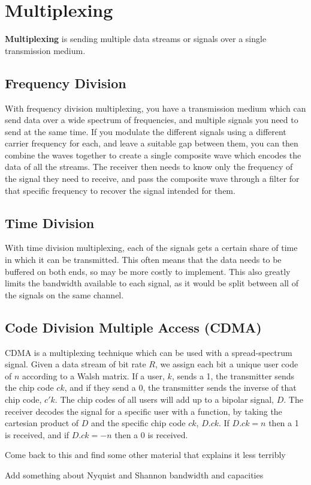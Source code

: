 \section*{Multiplexing}

\begin{definition*}{}{}
  \textbf{Multiplexing} is sending multiple data streams or signals over a single transmission medium.
\end{definition*}

\subsection*{Frequency Division}

With frequency division multiplexing, you have a transmission medium which can send data over a wide spectrum of frequencies,
 and multiple signals you need to send at the same time. If you modulate the different signals using a different carrier
 frequency for each, and leave a suitable gap between them, you can then combine the waves together to create a single
 composite wave which encodes the data of all the streams. The receiver then needs to know only the frequency of the
 signal they need to receive, and pass the composite wave through a filter for that specific frequency to recover the
 signal intended for them.

\subsection*{Time Division}

With time division multiplexing, each of the signals gets a certain share of time in which it can be transmitted. This
 often means that the data needs to be buffered on both ends, so may be more costly to implement. This also greatly
 limits the bandwidth available to each signal, as it would be split between all of the signals on the same channel.

\subsection*{Code Division Multiple Access (CDMA)}

CDMA is a multiplexing technique which can be used with a spread-spectrum signal. Given a data stream of bit rate $R$,
 we assign each bit a unique user code of $n$ according to a Walsh matrix. If a user, $k$, sends a 1, the transmitter
 sends the chip code $ck$, and if they send a 0, the transmitter sends the inverse of that chip code, $c'k$. The chip
 codes of all users will add up to a bipolar signal, $D$. The receiver decodes the signal for a specific user with a
 function, by taking the cartesian product of $D$ and the specific chip code $ck$, $D.ck$. If $D.ck = n$ then a 1 is
 received, and if $D.ck = -n$ then a 0 is received.

{\huge Come back to this and find some other material that explains it less terribly}

{\huge Add something about Nyquist and Shannon bandwidth and capacities}